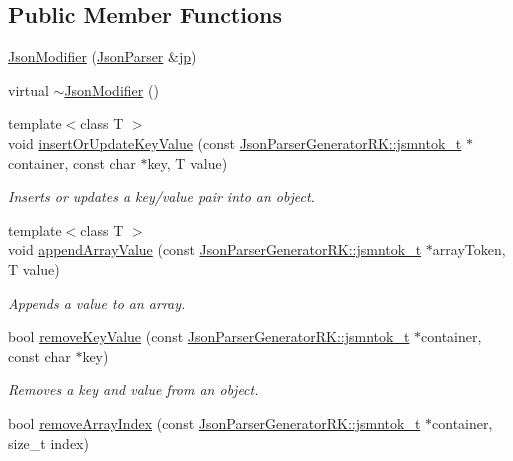 \subsection*{Public Member Functions}
\begin{DoxyCompactItemize}
\item 
\hyperlink{class_json_modifier_ac3d52284d9348720d59273bbbe228edf}{Json\+Modifier} (\hyperlink{class_json_parser}{Json\+Parser} \&\hyperlink{class_json_modifier_ab78d43036cea562e37640ae12e20b706}{jp})
\item 
virtual \hyperlink{class_json_modifier_a68e9b6a5b88ad4316fd1cb443cc0b11e}{$\sim$\+Json\+Modifier} ()
\item 
{\footnotesize template$<$class T $>$ }\\void \hyperlink{class_json_modifier_acca6028c0ec31489950f43e86c574229}{insert\+Or\+Update\+Key\+Value} (const \hyperlink{struct_json_parser_generator_r_k_1_1jsmntok__t}{Json\+Parser\+Generator\+R\+K\+::jsmntok\+\_\+t} $\ast$container, const char $\ast$key, T value)
\begin{DoxyCompactList}\small\item\em Inserts or updates a key/value pair into an object. \end{DoxyCompactList}\item 
{\footnotesize template$<$class T $>$ }\\void \hyperlink{class_json_modifier_ac492f5945ef4e4bc003fea5af5b9c504}{append\+Array\+Value} (const \hyperlink{struct_json_parser_generator_r_k_1_1jsmntok__t}{Json\+Parser\+Generator\+R\+K\+::jsmntok\+\_\+t} $\ast$array\+Token, T value)
\begin{DoxyCompactList}\small\item\em Appends a value to an array. \end{DoxyCompactList}\item 
bool \hyperlink{class_json_modifier_aadf76d2cef6b1a6ffe7868031cfb0e11}{remove\+Key\+Value} (const \hyperlink{struct_json_parser_generator_r_k_1_1jsmntok__t}{Json\+Parser\+Generator\+R\+K\+::jsmntok\+\_\+t} $\ast$container, const char $\ast$key)
\begin{DoxyCompactList}\small\item\em Removes a key and value from an object. \end{DoxyCompactList}\item 
bool \hyperlink{class_json_modifier_aba45c4fe467fa70b837f190986cf190b}{remove\+Array\+Index} (const \hyperlink{struct_json_parser_generator_r_k_1_1jsmntok__t}{Json\+Parser\+Generator\+R\+K\+::jsmntok\+\_\+t} $\ast$container, size\+\_\+t index)

\end{DoxyCompactItemize}
